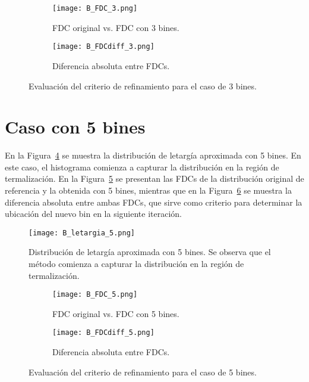 \begin{figure}[H]
    \centering
    \begin{subfigure}[b]{0.46\textwidth}
        \texttt{[image: B\_FDC\_3.png]}
        \caption{FDC original vs. FDC con 3 bines.}
        \label{fig:B_FDC_3}
    \end{subfigure}
    \hfill
    \begin{subfigure}[b]{0.46\textwidth}
        \texttt{[image: B\_FDCdiff\_3.png]}
        \caption{Diferencia absoluta entre FDCs.}
        \label{fig:B_FDCdiff_3}
    \end{subfigure}
    \caption{Evaluación del criterio de refinamiento para el caso de 3 bines.}
    \label{fig:B_FDC_3_3}
\end{figure}

\section*{Caso con 5 bines}

En la Figura~\ref{fig:B_letargia_5} se muestra la distribución de letargía aproximada con 5 bines. En este caso, el histograma comienza a capturar la distribución en la región de termalización. En la Figura~\ref{fig:B_FDC_5} se presentan las FDCs de la distribución original de referencia y la obtenida con 5 bines, mientras que en la Figura~\ref{fig:B_FDCdiff_5} se muestra la diferencia absoluta entre ambas FDCs, que sirve como criterio para determinar la ubicación del nuevo bin en la siguiente iteración.

\begin{figure}[H]
    \centering
    \texttt{[image: B\_letargia\_5.png]}
    \caption{Distribución de letargía aproximada con 5 bines. Se observa que el método comienza a capturar la distribución en la región de termalización.}
    \label{fig:B_letargia_5}
\end{figure}

\begin{figure}[H]
    \centering
    \begin{subfigure}[b]{0.46\textwidth}
        \texttt{[image: B\_FDC\_5.png]}
        \caption{FDC original vs. FDC con 5 bines.}
        \label{fig:B_FDC_5}
    \end{subfigure}
    \hfill
    \begin{subfigure}[b]{0.46\textwidth}
        \texttt{[image: B\_FDCdiff\_5.png]}
        \caption{Diferencia absoluta entre FDCs.}
        \label{fig:B_FDCdiff_5}
    \end{subfigure}
    \caption{Evaluación del criterio de refinamiento para el caso de 5 bines.}
    \label{fig:B_FDC_5_5}
\end{figure}

